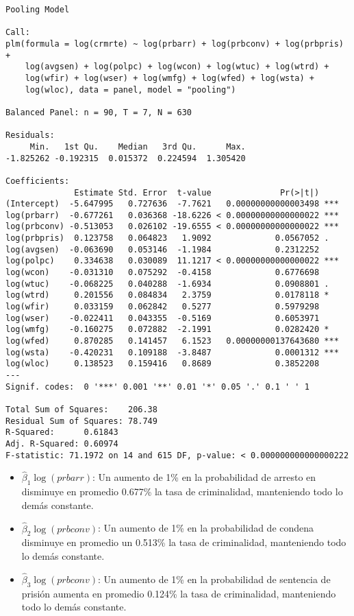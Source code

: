 \documentclass[
  12pt,
]{article}
\begin{document}
\begin{verbatim}
Pooling Model

Call:
plm(formula = log(crmrte) ~ log(prbarr) + log(prbconv) + log(prbpris) + 
    log(avgsen) + log(polpc) + log(wcon) + log(wtuc) + log(wtrd) + 
    log(wfir) + log(wser) + log(wmfg) + log(wfed) + log(wsta) + 
    log(wloc), data = panel, model = "pooling")

Balanced Panel: n = 90, T = 7, N = 630

Residuals:
     Min.   1st Qu.    Median   3rd Qu.      Max. 
-1.825262 -0.192315  0.015372  0.224594  1.305420 

Coefficients:
              Estimate Std. Error  t-value              Pr(>|t|)    
(Intercept)  -5.647995   0.727636  -7.7621   0.00000000000003498 ***
log(prbarr)  -0.677261   0.036368 -18.6226 < 0.00000000000000022 ***
log(prbconv) -0.513053   0.026102 -19.6555 < 0.00000000000000022 ***
log(prbpris)  0.123758   0.064823   1.9092             0.0567052 .  
log(avgsen)  -0.063690   0.053146  -1.1984             0.2312252    
log(polpc)    0.334638   0.030089  11.1217 < 0.00000000000000022 ***
log(wcon)    -0.031310   0.075292  -0.4158             0.6776698    
log(wtuc)    -0.068225   0.040288  -1.6934             0.0908801 .  
log(wtrd)     0.201556   0.084834   2.3759             0.0178118 *  
log(wfir)     0.033159   0.062842   0.5277             0.5979298    
log(wser)    -0.022411   0.043355  -0.5169             0.6053971    
log(wmfg)    -0.160275   0.072882  -2.1991             0.0282420 *  
log(wfed)     0.870285   0.141457   6.1523   0.00000000137643680 ***
log(wsta)    -0.420231   0.109188  -3.8487             0.0001312 ***
log(wloc)     0.138523   0.159416   0.8689             0.3852208    
---
Signif. codes:  0 '***' 0.001 '**' 0.01 '*' 0.05 '.' 0.1 ' ' 1

Total Sum of Squares:    206.38
Residual Sum of Squares: 78.749
R-Squared:      0.61843
Adj. R-Squared: 0.60974
F-statistic: 71.1972 on 14 and 615 DF, p-value: < 0.000000000000000222
\end{verbatim}

\begin{itemize}
\item
  \(\hat{\beta}_1\log(prbarr)\): Un aumento de 1\% en la probabilidad de
  arresto en disminuye en promedio 0.677\% la tasa de criminalidad,
  manteniendo todo lo demás constante.
\item
  \(\hat{\beta}_2\log(prbconv)\): Un aumento de 1\% en la probabilidad
  de condena disminuye en promedio un 0.513\% la tasa de criminalidad,
  manteniendo todo lo demás constante.
\item
  \(\hat{\beta}_3\log(prbconv)\): Un aumento de 1\% en la probabilidad
  de sentencia de prisión aumenta en promedio 0.124\% la tasa de
  criminalidad, manteniendo todo lo demás constante.
\end{itemize}
\end{document}
